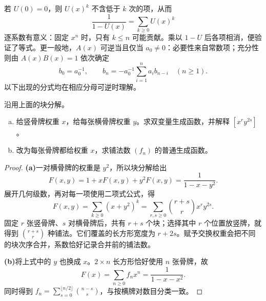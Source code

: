 \documentclass[lang=cn,a4paper,fontset=none,zihao=false,10pt,openany,twoside]{beautybook}
\numberwithin{algorithm}{chapter}
\begin{document}
若 $U(0)=0$，则 $U(x)^k$ 不含低于 $k$ 次的项，从而
\[
 \frac1{1-U(x)}=\sum_{k\ge0}U(x)^k
\]
逐系数有意义：固定 $x^n$ 时，只有 $k\le n$ 可能贡献。乘以 $1-U$ 后各项相消，便验证了等式。更一般地，$A(x)$ 可逆当且仅当 $a_0\ne0$：必要性来自常数项；充分性则由 $A(x)B(x)=1$ 依次确定
\[
 b_0=a_0^{-1},\qquad
 b_n=-a_0^{-1}\sum_{i=1}^na_i b_{n-i}\quad(n\ge1).
\]
以下出现的分式均在相应分母可逆时理解。

\begin{example}[为骨牌铺法赋予权重]\label{ex:domino-two-rows-gf}
沿用上面的块分解。
\begin{enumerate}[(a)]
\item 给竖骨牌权重 $x$，给每张横骨牌权重 $y$。求双变量生成函数，并解释 $[x^ry^{2s}]$。
\item 改为每张骨牌都给权重 $x$，求铺法数 $(f_n)$ 的普通生成函数。
\end{enumerate}
\end{example}
\begin{proof}
\par\smallskip\noindent\textbf{(a)}\quad 一对横骨牌的权重是 $y^2$，所以块分解给出
\[
 F(x,y)=1+xF(x,y)+y^2F(x,y)
       =\frac1{1-x-y^2}.
\]
展开几何级数，再对每一项使用二项式公式，得
\[
 F(x,y)=\sum_{k\ge0}(x+y^2)^k
 =\sum_{r,s\ge0}\binom{r+s}r x^ry^{2s}.
\]
固定 $r$ 张竖骨牌、$s$ 对横骨牌后，共有 $r+s$ 个块；选择其中 $r$ 个位置放竖牌，就得到 $\binom{r+s}r$ 种铺法。它们覆盖的长方形宽度为 $r+2s$。赋予交换权重会把不同的块次序合并，系数恰好记录合并前的铺法数。

\par\smallskip\noindent\textbf{(b)}\quad 将上式中的 $y$ 也换成 $x$。$2\times n$ 长方形恰好使用 $n$ 张骨牌，故
\[
 F(x)=\sum_{n\ge0}f_nx^n=\frac1{1-x-x^2}.
\]
同时得到 $f_n=\sum_{s=0}^{\lfloor n/2\rfloor}\binom{n-s}s$，与按横牌对数目分类一致。
\end{proof}
\end{document}
